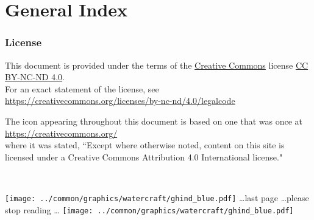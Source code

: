 \chapter*{General Index}
\begin{multicols}{3}
  
\end{multicols}

\subsection*{License}
This document is provided under the terms of 
the \href{https://creativecommons.org/}{Creative Commons} license \href{https://creativecommons.org/licenses/}{CC BY-NC-ND 4.0}.
\\For an exact statement of the license, see 
\\\indentx\url{https://creativecommons.org/licenses/by-nc-nd/4.0/legalcode}

The icon 
appearing throughout this document is based on one that was once at 
\\\indentx\url{https://creativecommons.org/}\\
where it was stated, 
``Except where otherwise noted, content on this site is licensed under a Creative Commons Attribution 4.0 International license."

\mbox{}\\\vfill
%
\begin{center}
\texttt{[image: ../common/graphics/watercraft/ghind\_blue.pdf]}%
{\sffamily\ldots last page \ldots please stop reading \ldots} 
\texttt{[image: ../common/graphics/watercraft/ghind\_blue.pdf]}%
\label{doc:end}
\end{center}






